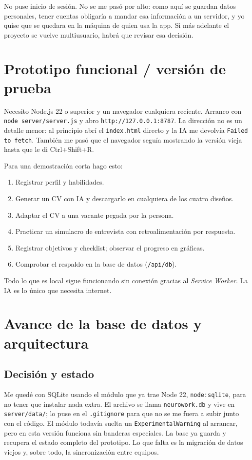 \documentclass[runningheads]{llncs}
\begin{document}
No puse inicio de sesión. No se me pasó por alto: como aquí se guardan datos personales, tener
cuentas obligaría a mandar esa información a un servidor, y yo quise que se quedara en la
máquina de quien usa la app. Si más adelante el proyecto se vuelve multiusuario, habrá que
revisar esa decisión.

\section{Prototipo funcional / versión de prueba}
Necesito Node.js 22 o superior y un navegador cualquiera reciente. Arranco con
\texttt{node server/server.js} y abro \texttt{http://127.0.0.1:8787}. La dirección no es un
detalle menor: al principio abrí el \texttt{index.html} directo y la IA me devolvía
\texttt{Failed to fetch}. También me pasó que el navegador seguía mostrando la versión vieja
hasta que le di Ctrl+Shift+R.

\noindent Para una demostración corta hago esto:
\begin{enumerate}
\item Registrar perfil y habilidades.
\item Generar un CV con IA y descargarlo en cualquiera de los cuatro diseños.
\item Adaptar el CV a una vacante pegada por la persona.
\item Practicar un simulacro de entrevista con retroalimentación por respuesta.
\item Registrar objetivos y checklist; observar el progreso en gráficas.
\item Comprobar el respaldo en la base de datos (\texttt{/api/db}).
\end{enumerate}
Todo lo que es local sigue funcionando sin conexión gracias al \emph{Service Worker}. La IA
es lo único que necesita internet.

\section{Avance de la base de datos y arquitectura}
\subsection{Decisión y estado}
Me quedé con SQLite usando el módulo que ya trae Node 22, \texttt{node:sqlite}, para no tener
que instalar nada extra. El archivo se llama \texttt{neurowork.db} y vive en
\texttt{server/data/}; lo puse en el \texttt{.gitignore} para que no se me fuera a subir junto
con el código. El módulo todavía suelta un \texttt{ExperimentalWarning} al arrancar, pero en
esta versión funciona sin banderas especiales. La base ya guarda y recupera el estado completo
del prototipo. Lo que falta es la migración de datos viejos y, sobre todo, la sincronización
entre equipos.
\end{document}
